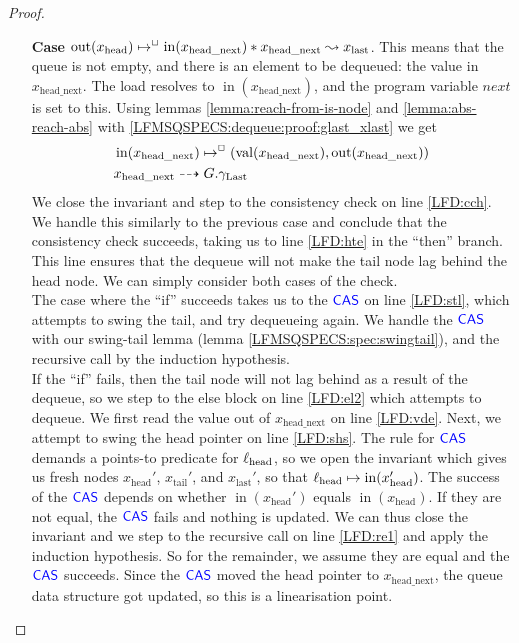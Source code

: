 \documentclass[a4paper, 10pt]{report}
\theoremstyle{definition}
\newcommand{\locN}[1]{\loc_{\mathrm{#1}}}
\newcommand{\lochead}{\locN{head}}
\newcommand{\nIn}[1]{\operatorname{in}(#1)}
\newcommand{\nVal}[1]{\operatorname{val}(#1)}
\newcommand{\nOut}[1]{\operatorname{out}(#1)}
\newcommand{\node}{x}
\newcommand{\nodeN}[1]{\node_{\mathrm{#1}}}
\newcommand{\nodehead}{\nodeN{head}}
\newcommand{\nodetail}{\nodeN{tail}}
\newcommand{\nodelast}{\nodeN{last}}
\newcommand{\nodeheadnext}{\nodeN{head\_next}}
\newcommand{\Qg}{G}
\newcommand{\glast}{\gname_{\mathrm{Last}}}
\newcommand{\isNode}[1]{\nIn{#1} \mapsto^{\persistently} (\nVal{#1}, \nOut{#1})}
\newcommand{\reach}[2]{#1 \leadsto #2}
\newcommand{\ar}[2]{#1 \dashrightarrow #2}
\begin{document}
\begin{proof}
\begin{itemize}
\begin{itemize}
      \item[\textbf{Case}] $\nOut{\nodehead} \mapsto^{\persistently} \nIn{\nodeheadnext} \star{} \reach{\nodeheadnext}{\nodelast}$. This means that the queue is not empty, and there is an element to be dequeued: the value in $\nodeheadnext$. The load resolves to $\nIn{\nodeheadnext}$, and the program variable $next$ is set to this. Using lemmas \ref{lemma:reach-from-is-node} and \ref{lemma:abs-reach-abs} with \ref{LFMSQSPECS:dequeue:proof:glast_xlast} we get
      \begin{align}
        &\isNode{\nodeheadnext}\label{LFMSQSPECS:dequeue:proof:x_headnext_node}\\
        &\ar{\nodeheadnext}{\Qg.\glast}\label{LFMSQSPECS:dequeue:proof:x_headnext_glast}
      \end{align}
      We close the invariant and step to the consistency check on line \ref{LFD:cch}. We handle this similarly to the previous case and conclude that the consistency check succeeds, taking us to line \ref{LFD:hte} in the ``then'' branch. This line ensures that the dequeue will not make the tail node lag behind the head node. We can simply consider both cases of the check.\\
      The case where the ``if'' succeeds takes us to the $\textsf{\color{blue} CAS}$ on line \ref{LFD:stl}, which attempts to swing the tail, and try dequeueing again. We handle the $\textsf{\color{blue} CAS}$ with our swing-tail lemma (lemma \ref{LFMSQSPECS:spec:swingtail}), and the recursive call by the induction hypothesis.\\
      If the ``if'' fails, then the tail node will not lag behind as a result of the dequeue, so we step to the else block on line \ref{LFD:el2} which attempts to dequeue. We first read the value out of $\nodeheadnext$ on line \ref{LFD:vde}. Next, we attempt to swing the head pointer on line \ref{LFD:shs}. The rule for $\textsf{\color{blue} CAS}$ demands a points-to predicate for $\lochead$, so we open the invariant which gives us fresh nodes $\nodehead'$, $\nodetail'$, and $\nodelast'$, so that $\lochead \mapsto \nIn{\nodehead'}$. The success of the $\textsf{\color{blue} CAS}$ depends on whether $\nIn{\nodehead'}$ equals $\nIn{\nodehead}$. If they are not equal, the $\textsf{\color{blue} CAS}$ fails and nothing is updated. We can thus close the invariant and we step to the recursive call on line \ref{LFD:re1} and apply the induction hypothesis. So for the remainder, we assume they are equal and the $\textsf{\color{blue} CAS}$ succeeds. Since the $\textsf{\color{blue} CAS}$ moved the head pointer to $\nodeheadnext$, the queue data structure got updated, so this is a linearisation point.\\

\end{itemize}
\end{itemize}
\end{proof}
\end{document}
